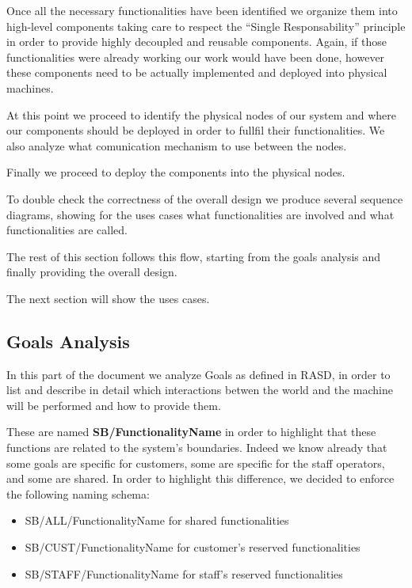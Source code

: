 \documentclass[11pt]{article} %
\begin{document}
Once all the necessary functionalities have been identified we organize them into high-level components taking care to respect the ``Single Responsability'' principle in order to provide highly decoupled and reusable components.
Again, if those functionalities were already working our work would have been done, however these components need to be actually implemented and deployed into physical machines.

At this point we proceed to identify the physical nodes of our system and where our components should be deployed in order to fullfil their functionalities. We also analyze what comunication mechanism to use between the nodes.

Finally we proceed to deploy the components into the physical nodes.

To double check the correctness of the overall design we produce several sequence diagrams, showing for the uses cases what functionalities are involved and what functionalities are called.

The rest of this section follows this flow, starting from the goals analysis and finally providing the overall design.

The next section will show the uses cases.

\subsection{Goals Analysis}

In this part of the document we analyze Goals as defined in RASD, in order to list and describe in detail which interactions betwen the world and the machine will be performed and how to provide them. 

These are named \textbf{SB/FunctionalityName} in order to highlight that these functions are related to the system's boundaries. Indeed we know already that some goals are specific for customers, some are specific for the staff operators, and some are shared. In order to highlight this difference, we decided to enforce the following naming schema:
\begin{itemize}[noitemsep]
	\item SB/ALL/FunctionalityName for shared functionalities
	\item SB/CUST/FunctionalityName for customer's reserved functionalities
	\item SB/STAFF/FunctionalityName for staff's reserved functionalities
\end{itemize}
\end{document}
